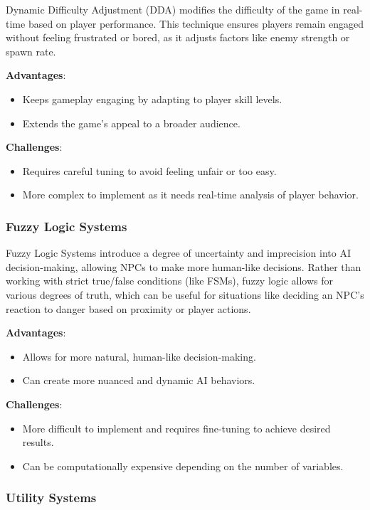Dynamic Difficulty Adjustment (DDA) modifies the difficulty of the game in real-time based on player performance. This technique ensures players remain engaged without feeling frustrated or bored, as it adjusts factors like enemy strength or spawn rate.

\textbf{Advantages}:
\begin{itemize}
    \item Keeps gameplay engaging by adapting to player skill levels.
    \item Extends the game's appeal to a broader audience.
\end{itemize}

\textbf{Challenges}:
\begin{itemize}
    \item Requires careful tuning to avoid feeling unfair or too easy.
    \item More complex to implement as it needs real-time analysis of player behavior.
\end{itemize}

\subsubsection{Fuzzy Logic Systems}

Fuzzy Logic Systems introduce a degree of uncertainty and imprecision into AI decision-making, allowing NPCs to make more human-like decisions. Rather than working with strict true/false conditions (like FSMs), fuzzy logic allows for various degrees of truth, which can be useful for situations like deciding an NPC's reaction to danger based on proximity or player actions.

\textbf{Advantages}:
\begin{itemize}
    \item Allows for more natural, human-like decision-making.
    \item Can create more nuanced and dynamic AI behaviors.
\end{itemize}

\textbf{Challenges}:
\begin{itemize}
    \item More difficult to implement and requires fine-tuning to achieve desired results.
    \item Can be computationally expensive depending on the number of variables.
\end{itemize}

\subsubsection{Utility Systems}

